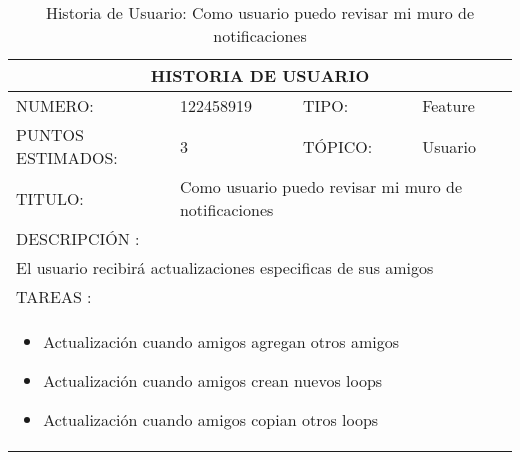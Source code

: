 \begin{table}[h]
\centering
\renewcommand{\arraystretch}{1.4}
\begin{tabular}{|*{4}{l|}}
\hline
\multicolumn{4}{|c|}{HISTORIA DE USUARIO} \\ \hline
NUMERO: & 122458919 & TIPO: & Feature \\ \hline
PUNTOS ESTIMADOS: & 3 & TÓPICO: & Usuario \\ \hline
TITULO: & \multicolumn{3}{|p{7.2cm}|}{Como usuario puedo revisar mi muro de notificaciones} \\ \hline
\multicolumn{4}{|l|}{DESCRIPCIÓN : } \\ \hline
\multicolumn{4}{p{11cm}}{El usuario recibirá actualizaciones especificas de sus amigos} \\ \hline
\multicolumn{4}{|l|}{TAREAS : } \\ \hline
\multicolumn{4}{|p{11cm}|}{
\begin{minipage}[t]{\hsize}
  \begin{itemize}
    \item Actualización cuando amigos agregan otros amigos
    \item Actualización cuando amigos crean nuevos loops
    \item Actualización cuando amigos copian otros loops
  \end{itemize}
\end{minipage}
} \\ \hline
\end{tabular}
\caption{Historia de Usuario: Como usuario puedo revisar mi muro de notificaciones}
\label{tab:Primero}
\end{table}


